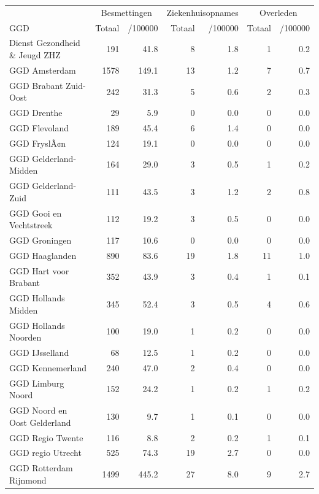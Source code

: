 \documentclass[
  english,
  man,floatsintext]{apa6}
\begin{document}
\begin{table}[H]
\centering\begingroup\fontsize{10}{12}\selectfont

\begin{threeparttable}
\begin{tabular}{lrrrrrr}
\toprule
\multicolumn{1}{c}{ } & \multicolumn{2}{c}{Besmettingen} & \multicolumn{2}{c}{Ziekenhuisopnames} & \multicolumn{2}{c}{Overleden} \\
\cmidrule(l{3pt}r{3pt}){2-3} \cmidrule(l{3pt}r{3pt}){4-5} \cmidrule(l{3pt}r{3pt}){6-7}
GGD & Totaal & /100000 & Totaal & /100000 & Totaal & /100000\\
\midrule
Dienst Gezondheid \& Jeugd ZHZ & 191 & 41.8 & 8 & 1.8 & 1 & 0.2\\
GGD Amsterdam & 1578 & 149.1 & 13 & 1.2 & 7 & 0.7\\
GGD Brabant Zuid-Oost & 242 & 31.3 & 5 & 0.6 & 2 & 0.3\\
GGD Drenthe & 29 & 5.9 & 0 & 0.0 & 0 & 0.0\\
GGD Flevoland & 189 & 45.4 & 6 & 1.4 & 0 & 0.0\\
GGD FryslÃ¢n & 124 & 19.1 & 0 & 0.0 & 0 & 0.0\\
GGD Gelderland-Midden & 164 & 29.0 & 3 & 0.5 & 1 & 0.2\\
GGD Gelderland-Zuid & 111 & 43.5 & 3 & 1.2 & 2 & 0.8\\
GGD Gooi en Vechtstreek & 112 & 19.2 & 3 & 0.5 & 0 & 0.0\\
GGD Groningen & 117 & 10.6 & 0 & 0.0 & 0 & 0.0\\
GGD Haaglanden & 890 & 83.6 & 19 & 1.8 & 11 & 1.0\\
GGD Hart voor Brabant & 352 & 43.9 & 3 & 0.4 & 1 & 0.1\\
GGD Hollands Midden & 345 & 52.4 & 3 & 0.5 & 4 & 0.6\\
GGD Hollands Noorden & 100 & 19.0 & 1 & 0.2 & 0 & 0.0\\
GGD IJsselland & 68 & 12.5 & 1 & 0.2 & 0 & 0.0\\
GGD Kennemerland & 240 & 47.0 & 2 & 0.4 & 0 & 0.0\\
GGD Limburg Noord & 152 & 24.2 & 1 & 0.2 & 1 & 0.2\\
GGD Noord en Oost Gelderland & 130 & 9.7 & 1 & 0.1 & 0 & 0.0\\
GGD Regio Twente & 116 & 8.8 & 2 & 0.2 & 1 & 0.1\\
GGD regio Utrecht & 525 & 74.3 & 19 & 2.7 & 0 & 0.0\\
GGD Rotterdam Rijnmond & 1499 & 445.2 & 27 & 8.0 & 9 & 2.7\\

\end{tabular}
\end{threeparttable}
\end{table}
\end{document}
